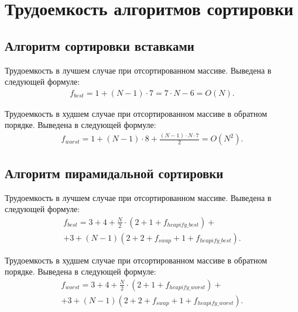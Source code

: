 \section{Трудоемкость алгоритмов сортировки}

\subsection{Алгоритм сортировки вставками}

Трудоемкость в лучшем случае при отсортированном массиве.
Выведена в следующей формуле:
\begin{equation}
	\label{сomplexity:insert_best}
	\begin{gathered}
		f_{best} = 1 + (N - 1) \cdot 7 = 7 \cdot N - 6 = O(N).
	\end{gathered}
\end{equation}

Трудоемкость в худшем случае при отсортированном массиве в обратном порядке.
Выведена в следующей формуле:
\begin{equation}
	\label{сomplexity:insert_worst}
	\begin{gathered}
		f_{worst} = 1 + (N - 1) \cdot 8 + \frac{(N - 1) \cdot N \cdot 7}{2} = O(N^2).
	\end{gathered}
\end{equation}

\clearpage

\subsection{Алгоритм пирамидальной сортировки}

Трудоемкость в лучшем случае при отсортированном массиве.
Выведена в следующей формуле:
\begin{equation}
	\label{сomplexity:heap_best_t}
	\begin{gathered}
		f_{best} = 3 + 4 + \frac{N}{2} \cdot (2 + 1 + f_{heapify\_best}) + \\
		+ 3 + (N - 1)(2 + 2 + f_{swap} + 1 + f_{heapify\_best}).
	\end{gathered}
\end{equation}

Трудоемкость в худшем случае при отсортированном массиве в обратном порядке.
Выведена в следующей формуле:
\begin{equation}
	\label{сomplexity:heap_worst_t}
	\begin{gathered}
		f_{worst} = 3 + 4 + \frac{N}{2} \cdot (2 + 1 + f_{heapify\_worst}) + \\
		+ 3 + (N - 1)(2 + 2 + f_{swap} + 1 + f_{heapify\_worst}).
	\end{gathered}
\end{equation}

